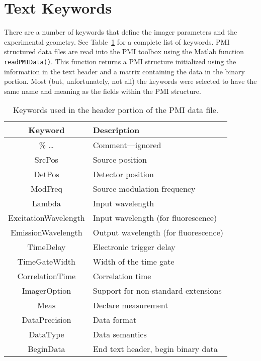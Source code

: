 \documentclass[12pt]{article}
\begin{document}
\section{Text Keywords}
\label{sec:keywords}

There are a number of keywords that define the imager parameters and
the experimental geometry.  See Table~\ref{tbl:keywords} for a
complete list of keywords.  PMI structured data files are read into
the PMI toolbox using the Matlab function {\tt readPMIData()}.  This
function returns a PMI structure initialized using the information in
the text header and a matrix containing the data in the binary
portion.  Most (but, unfortunately, not all) the keywords were
selected to have the same name and meaning as the fields within the
PMI structure.


\begin{table}[p]
\begin{center}
\begin{tabular} {|c|l|}
\hline
Keyword & Description \\ \hline
\hline
\% \ldots & Comment---ignored \\ \hline
SrcPos               & Source position  \\ \hline
DetPos               & Detector position \\ \hline
ModFreq              & Source modulation frequency \\ \hline
Lambda               & Input wavelength \\ \hline
ExcitationWavelength & Input wavelength (for fluorescence) \\ \hline
EmissionWavelength   & Output wavelength (for fluorescence) \\ \hline
TimeDelay            & Electronic trigger delay \\ \hline
TimeGateWidth        & Width of the time gate   \\ \hline
CorrelationTime      & Correlation time         \\ \hline
ImagerOption         & Support for non-standard extensions \\ \hline
Meas                 & Declare measurement \\ \hline

DataPrecision        & Data format    \\ \hline
DataType             & Data semantics \\ \hline
BeginData            & End text header, begin binary data \\ \hline
\end{tabular}
\end{center}
\caption{Keywords used in the header portion of the PMI data file.}
\label{tbl:keywords}
\end{table}
\end{document}
